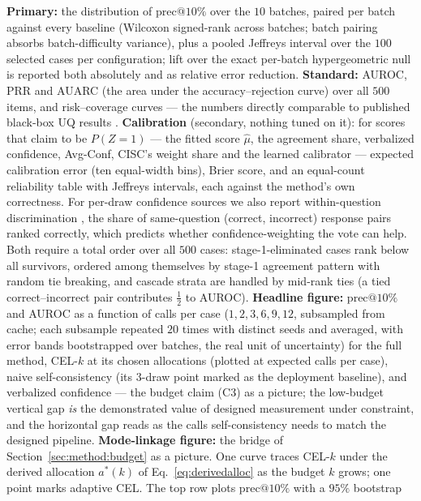 \documentclass[11pt]{article}
\makeatletter
\newcommand{\precat}[1]{\mathrm{prec}@#1}
\makeatother
\begin{document}
\textbf{Primary:} the distribution of $\precat{10\%}$ over the $10$
batches, paired per batch against every baseline (Wilcoxon signed-rank
across batches; batch pairing absorbs batch-difficulty variance), plus
a pooled Jeffreys interval over the $100$ selected cases per
configuration; lift over the exact per-batch hypergeometric null is
reported both absolutely and as relative error reduction.
\textbf{Standard:} AUROC, PRR \citep{vashurin2025} and AUARC (the
area under the accuracy--rejection curve) over all $500$ items, and
risk--coverage curves --- the numbers directly comparable to published
black-box UQ results \citep{xiong2023,pedapati2024}.
\textbf{Calibration} (secondary, nothing tuned on it): for scores that
claim to be $P(Z = 1)$ --- the fitted score $\hat\mu$, the agreement
share, verbalized confidence, Avg-Conf, CISC's weight share and the
learned calibrator --- expected calibration error (ten equal-width
bins), Brier score, and an equal-count reliability table with Jeffreys
intervals, each against the method's own correctness. For per-draw
confidence sources we also report within-question discrimination
\citep{taubenfeld2025}, the share of same-question
(correct, incorrect) response pairs ranked correctly, which predicts
whether confidence-weighting the vote can help. Both require a total order over
all $500$ cases: stage-1-eliminated cases rank below all survivors,
ordered among themselves by stage-1 agreement pattern with random tie
breaking, and cascade strata are handled by mid-rank ties (a tied
correct--incorrect pair contributes $\tfrac12$ to AUROC).
\textbf{Headline figure:} $\precat{10\%}$ and AUROC as a function of
calls per case ($1, 2, 3, 6, 9, 12$, subsampled from cache; each subsample
repeated $20$ times with distinct seeds and averaged, with error bands
bootstrapped over batches, the real unit of uncertainty) for the full
method, CEL-$k$ at its chosen allocations (plotted at expected calls per
case), naive self-consistency (its $3$-draw point marked as the
deployment baseline), and verbalized confidence ---
the budget claim (C3) as a picture; the low-budget vertical gap
\emph{is} the demonstrated value of designed measurement under
constraint, and the horizontal gap reads as the calls self-consistency
needs to match the designed pipeline.
\textbf{Mode-linkage figure:} the bridge of
Section~\ref{sec:method:budget} as a picture. One curve traces CEL-$k$
under the derived allocation $a^{\ast}(k)$ of
Eq.~\eqref{eq:derivedalloc} as the budget $k$ grows; one point marks
adaptive CEL. The top row plots $\precat{10\%}$ with a $95\%$ bootstrap
\end{document}
